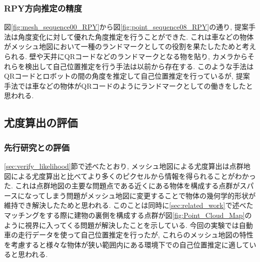 \subsubsection{RPY方向推定の精度}
図\ref{fig:mesh_sequence00_RPY}から図\ref{fig:point_sequence08_RPY}の通り, 提案手法は角度変化に対して優れた角度推定を行うことができた. これは車などの物体がメッシュ地図において一種のランドマークとしての役割を果たしたためと考えられる. 壁や天井にQRコードなどのランドマークとなる物を貼り, カメラからそれらを検出して自己位置推定を行う手法は以前から存在する\cite{QR_code_localization}. このような手法はQRコードとロボットの間の角度を推定して自己位置推定を行っているが, 提案手法では車などの物体がQRコードのようにランドマークとしての働きをしたと思われる.

\subsection{尤度算出の評価}



\subsubsection{先行研究との評価}
\ref{sec:verify_likelihood}節で述べたとおり, メッシュ地図による尤度算出は点群地図による尤度算出と比べてより多くのピクセルから情報を得られることがわかった. これは点群地図の主要な問題点である近くにある物体を構成する点群がスパースになってしまう問題がメッシュ地図に変更することで物体の幾何学的形状が維持でき解決したためと思われる. このことは同時に\ref{sec:related_work}で述べたマッチングをする際に建物の裏側を構成する点群が図\ref{fig:Point_Cloud_Map}のように視界に入ってくる問題が解決したことを示している. 今回の実験では自動車の走行データを使って自己位置推定を行ったが, これらのメッシュ地図の特性を考慮すると様々な物体が狭い範囲内にある環境下での自己位置推定に適していると思われる.

